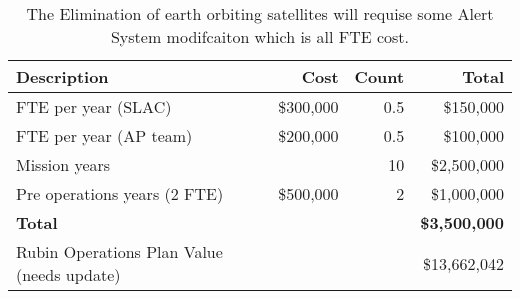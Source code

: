 \tiny \begin{longtable} {|l|r|r|r|} \caption{The Elimination of earth orbiting satellites will requise some Alert System modifcaiton which is all FTE cost. \label{tab:eliminate}}\\ 
\hline 
\textbf{Description}&\textbf{Cost}&\textbf{Count}&\textbf{Total} \\ \hline
{FTE per year (SLAC)}&{\$300,000}&{0.5}&{\$150,000} \\ \hline
{FTE per year (AP team)}&{\$200,000}&{0.5}&{\$100,000} \\ \hline
{Mission years}&{}&{10}&{\$2,500,000} \\ \hline
{Pre operations years (2 FTE)}&{\$500,000}&{2}&{\$1,000,000} \\ \hline
\textbf{Total }&\textbf{}&\textbf{}&\textbf{\$3,500,000} \\ \hline
{Rubin Operations Plan Value (needs update)}&{}&{}&{\$13,662,042} \\ \hline
\end{longtable} \normalsize
